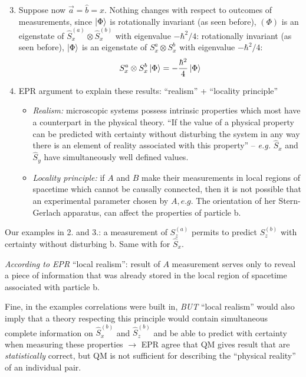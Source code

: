 \documentclass[12pt]{article}
\begin{document}
\begin{enumerate}
\setcounter{enumi}{2}
\item Suppose now \(\vec{a}=\hat{b}=\hat{x}\). Nothing changes with
respect to outcomes of measurements, since $\ket{\Phi}$ is
rotationally invariant (as seen before), \((\Phi)\) is an
eigenstate of \(\hat{S}_{x}^{(a)} \otimes \hat{S}_{x}^{(b)}\) with eigenvalue \(-\hbar^{2} / 4\):
rotationally invariant (as seen before), $\ket{\Phi}$ is an
eigenstate of $S_{x}^{a} \otimes S_{x}^{b}$ with eigenvalue $-\hbar^2/4$:
\[
S_{x}^{a} \otimes S_{x}^{b}\ket{\Phi} = -\frac{\hbar^2}{4} \ket{\Phi}
\]

\item EPR argument to explain these results:
``realism'' + ``locality principle''
\begin{itemize}
\item\emph{Realism:} microscopic systems possess intrinsic
properties which most have a counterpart
in the physical theory.
``If the value of a physical property can be predicted
with certainty without disturbing the system in any
way there is an element of reality associated with
this property'' -- \textit{e.g.} $\hat{S}_x$ and $\hat{S}_y$ have simultaneously well defined values.
\item\emph{Locality principle:} if \(A\) and \(B\) make their measurements
in local regions of spacetime which cannot be
causally connected, then it is not possible that
an experimental parameter chosen by \(A, e . g\). The
orientation of her Stern-Gerlach apparatus, can affect
the properties of particle b.
\end{itemize}
\end{enumerate}

Our examples in 2. and 3.: a measurement of
\(S_{z}^{(a)}\) permits to predict \(S_{z}^{(b)}\) with certainty
without disturbing b. Same with for \(\hat{S}_{x}\).


\emph{According to EPR} ``local realism'': result of \(A\)
measurement serves only to reveal a piece of
information that was already stored in the local
region of spacetime associated with particle b.

Fine, in the examples correlations were built in, \emph{BUT}
``local realism'' would also imply that a theory
respecting this principle would contain simultaneous 
complete information on \(\hat{S}_{x}^{(b)}\) and \(\hat{S}_{z}^{(b)}\) and be
able to predict with certainty when measuring these
properties $\to$ EPR agree that QM gives result
that are \emph{statistically} correct, but
QM is not sufficient for describing
the ``physical reality'' of an individual
pair.
\end{document}
